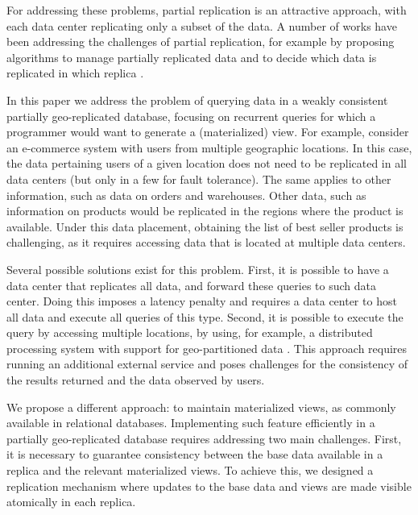 \documentclass{vldb}
\begin{document}
For addressing these problems, partial replication is an attractive approach, with each data center
replicating only a subset of the data. A number of works have been addressing the challenges of 
partial replication, for example by proposing algorithms to manage partially replicated data \cite{more,saturn,c3}
and to decide which data is replicated in which replica \cite{}.

In this paper we address the problem of querying data in a weakly consistent partially geo-replicated database, 
focusing on recurrent queries for which a programmer would want to generate a (materialized) view.
For example, consider an e-commerce system with users from multiple geographic locations.
In this case, the data pertaining users of a given location does not need to be replicated in all data centers
(but only in a few for fault tolerance). The same applies to other information, such as data on orders and 
warehouses.
Other data, such as information on products would be replicated in the regions where the product
is available.  
Under this data placement, obtaining the list of best seller products is challenging, as it requires
accessing data that is located at multiple data centers.

Several possible solutions exist for this problem. 
First, it is possible to have a data center that replicates all data, and forward these queries to such data center.
Doing this imposes a latency penalty and requires a data center to host all data and execute all queries of this type. %
Second, it is possible to execute the query by accessing multiple locations, by using, for example, 
a distributed processing system with support for geo-partitioned data %
\cite{kloudas2015pixida,more}.
This approach requires running an additional external service and poses challenges for the consistency of the results
returned and the data observed by users.

We propose a different approach: to maintain materialized views, as commonly available in relational databases.
Implementing such feature efficiently in a partially geo-replicated database requires 
addressing two main challenges. 
First, it is necessary to guarantee consistency between the base data available in a replica and the 
relevant materialized views. To achieve this, we designed a replication mechanism where updates 
to the base data and views are made visible atomically in each replica.
\end{document}
